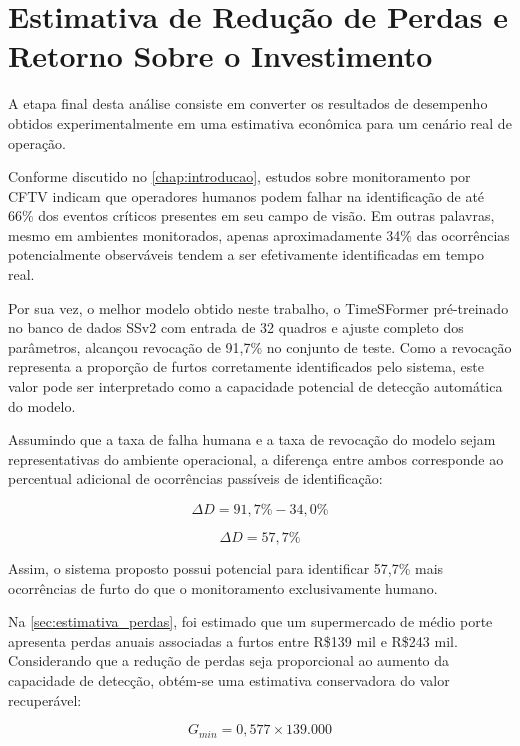 \documentclass[12pt, %
openright, 
oneside, %
a4paper,    %
brazil]{facom-ufu-abntex2}
\begin{document}
\section[Estimativa de Redução de Perdas e Retorno Sobre o Investimento]{Estimativa de Redução de Perdas e Retorno Sobre o Investimento}

A etapa final desta análise consiste em converter os resultados de desempenho obtidos experimentalmente em uma estimativa econômica para um cenário real de operação.

Conforme discutido no \autoref{chap:introducao}, estudos sobre monitoramento por CFTV indicam que operadores humanos podem falhar na identificação de até 66\% dos eventos críticos presentes em seu campo de visão. Em outras palavras, mesmo em ambientes monitorados, apenas aproximadamente 34\% das ocorrências potencialmente observáveis tendem a ser efetivamente identificadas em tempo real.

Por sua vez, o melhor modelo obtido neste trabalho, o TimeSFormer pré-treinado no banco de dados SSv2 com entrada de 32 quadros e ajuste completo dos parâmetros, alcançou revocação de 91,7\% no conjunto de teste. Como a revocação representa a proporção de furtos corretamente identificados pelo sistema, este valor pode ser interpretado como a capacidade potencial de detecção automática do modelo.

Assumindo que a taxa de falha humana e a taxa de revocação do modelo sejam representativas do ambiente operacional, a diferença entre ambos corresponde ao percentual adicional de ocorrências passíveis de identificação:

\begin{equation}
\Delta D = 91,7\% - 34,0\%
\end{equation}

\begin{equation}
\Delta D = 57,7\%
\end{equation}

Assim, o sistema proposto possui potencial para identificar 57,7\% mais ocorrências de furto do que o monitoramento exclusivamente humano.

Na \autoref{sec:estimativa_perdas}, foi estimado que um supermercado de médio porte apresenta perdas anuais associadas a furtos entre R\$139 mil e R\$243 mil. Considerando que a redução de perdas seja proporcional ao aumento da capacidade de detecção, obtém-se uma estimativa conservadora do valor recuperável:

\begin{equation}
G_{min}=0,577 \times 139.000
\end{equation}
\end{document}
